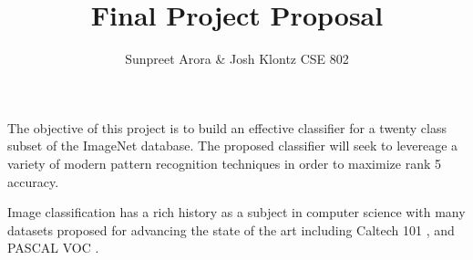 \documentclass[12pt]{article}
\begin{document}
 
\title{Final Project Proposal}
\author{Sunpreet Arora \& Josh Klontz
CSE 802}
 
\maketitle

The objective of this project is to build an effective classifier for a twenty class subset of the ImageNet \cite{imagenet} database.
The proposed classifier will seek to levereage a variety of modern pattern recognition techniques in order to maximize rank 5 accuracy.

Image classification has a rich history as a subject in computer science with many datasets proposed for advancing the state of the art including Caltech 101 \cite{caltech101}, and PASCAL VOC \cite{pascal09}.



\end{document}

